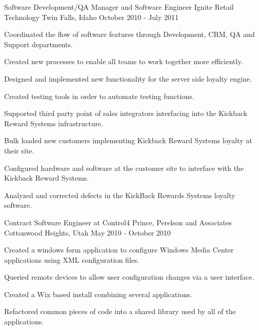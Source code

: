\cventry
{Software Development/QA Manager and Software Engineer} %
{Ignite Retail Technology} %
{Twin Falls, Idaho} %
{October 2010 - July 2011} %
{
	\begin{cvitems} %
		\item {Coordinated the flow of software features through Development, CRM, QA and Support departments.}
		\item {Created new processes to enable all teams to work together more efficiently.}
		\item {Designed and implemented new functionality for the server side loyalty engine.}
		\item {Created testing tools in order to automate testing functions.}
		\item {Supported third party point of sales integrators interfacing into the Kickback Reward Systems infrastructure.}
		\item {Bulk loaded new customers implementing Kickback Reward Systems loyalty at their site.}
		\item {Configured hardware and software at the customer site to interface with the Kickback Reward Systems.}
		\item {Analyzed and corrected defects in the KickBack Rewards Systems loyalty software.}
	\end{cvitems}
}

\cventry
{Contract Software Engineer at Control4} %
{Prince, Perelson and Associates} %
{Cottonwood Heights, Utah} %
{May 2010 - October 2010} %
{
	\begin{cvitems} %
		\item {Created a windows \Csh{} form application to configure Windows Media Center applications using XML configuration files.}
		\item {Queried remote devices to allow user configuration changes via a user interface.}
		\item {Created a Wix based install combining several applications.}
		\item {Refactored common pieces of code into a shared library used by all of the applications.}
	\end{cvitems}
}

